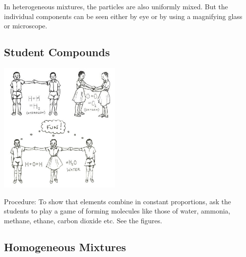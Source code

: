 \begin{multicols}{2}
\begin{description*}
{In heterogeneous mixtures, the particles are
also uniformly mixed. But the individual
components can be seen either by eye or by
using a magnifying glass or microscope.}
\end{description*}

\subsection{Student Compounds}

\begin{center}
\includegraphics[width=0.45\textwidth]{./img/source/student-compounds.jpg}
\end{center}

\begin{description*}
\item[Procedure:]{To show that elements combine in constant
proportions, ask the students to play a game of
forming molecules like those of water, ammonia,
methane, ethane, carbon dioxide etc. See the
figures.}
\end{description*}

\subsection{Homogeneous Mixtures}


\end{multicols}
